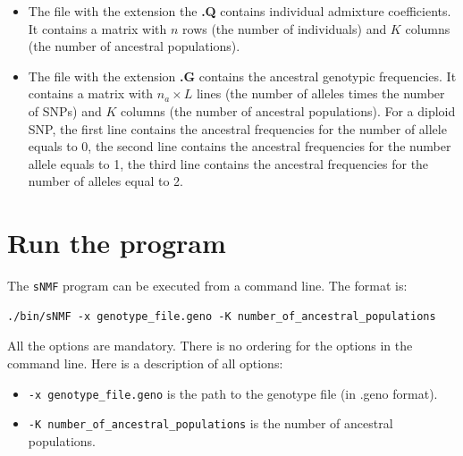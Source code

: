 \documentclass[10pt,a4paper]{article}
\begin{document}
\begin{itemize}
\item The file with the extension the {\bf .Q} contains individual admixture coefficients.
It contains a matrix with $n$ rows (the number of individuals) and $K$ columns (the 
number of ancestral populations).
\item The file with the extension {\bf .G} contains the ancestral genotypic frequencies.
It contains a matrix with $n_a\times L$ lines (the number of alleles times the number of SNPs) 
and $K$ columns (the number of ancestral populations). 
For a diploid SNP, the first line contains the ancestral frequencies for the number 
of allele equals to 0, the second line contains the ancestral frequencies for the 
number allele equals to 1, the third line contains the ancestral frequencies for 
the number of alleles equal to 2.
\end{itemize}

\section{Run the program}
The {\tt sNMF} program can be executed from a command line. The format is:
\begin{Verbatim}[frame=single]
./bin/sNMF -x genotype_file.geno -K number_of_ancestral_populations 
\end{Verbatim}

\noindent
All the options are mandatory. There is no ordering for the options in the command line. 
Here is a description of all options:
\begin{itemize}
\item \verb|-x genotype_file.geno| is the path to the genotype file (in .geno format).
\item \verb|-K number_of_ancestral_populations| is the number of ancestral populations. 
\end{itemize}
\end{document}
